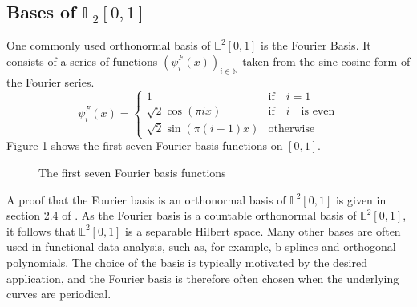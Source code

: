 \documentclass[12pt, a4paper]{article}
\theoremstyle{MAstyle} \newtheorem{assumption}{Assumption}[section]
\theoremstyle{MAstyle} \newtheorem{definition}{Definition}[section]
\theoremstyle{MAstyle} \newtheorem{theorem}{Theorem}[section]
\begin{document}
		\subsection{Bases of $\mathbb{L}_2[0,1]$}\label{bases_L2}
			One commonly used orthonormal basis of $\mathbb{L}^2[0,1]$ is the Fourier Basis. It consists of a series of functions $\left(\psi_{i}^{F}(x)\right)_{i \in \mathbb{N}}$ taken from the sine-cosine form of the Fourier series.
			\begin{equation}
				\psi_{i}^{F}(x) = 
				\begin{cases}
					1 & \text{if} \quad i = 1\\
					\sqrt{2} \cos(\pi i x) & \text{if} \quad i \quad \text{is even} \\
					\sqrt{2} \sin(\pi (i-1)x) & \text{otherwise}
				\end{cases}
			\end{equation}
			Figure \ref{fourier_basis} shows the first seven Fourier basis functions on $[0,1]$.
			\begin{figure}[H]
				\caption{The first seven Fourier basis functions}
				\label{fourier_basis}
			\end{figure}
			A proof that the Fourier basis is an orthonormal basis of $\mathbb{L}^2[0,1]$ is given in section 2.4 of \cite{hsing_theoretical_2015}. As the Fourier basis is a countable orthonormal basis of $\mathbb{L}^2[0,1]$, it follows that $\mathbb{L}^2[0,1]$ is a separable Hilbert space.
			Many other bases are often used in functional data analysis, such as, for example, b-splines and orthogonal polynomials. The choice of the basis is typically motivated by the desired application, and the Fourier basis is therefore often chosen when the underlying curves are periodical.
	
\end{document}
